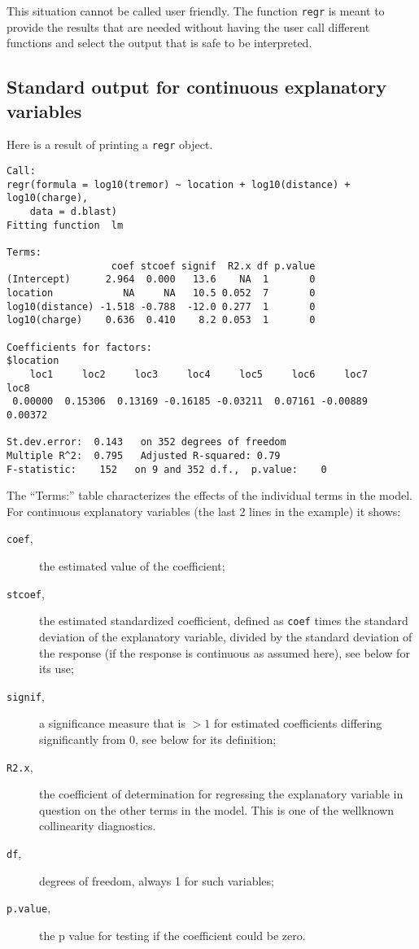 \documentclass{article}
\providecommand{\T}{\texttt}
\begin{document}
This situation cannot be called user friendly.
The function \T{regr} is meant to provide the results that are needed
without having the user call different functions and select the 
output that is safe to be interpreted.

\subsection{Standard output for continuous explanatory variables}
Here is a result of printing a \T{regr} object.
\begin{verbatim}
Call:
regr(formula = log10(tremor) ~ location + log10(distance) + log10(charge), 
    data = d.blast)
Fitting function  lm

Terms:
                  coef stcoef signif  R2.x df p.value
(Intercept)      2.964  0.000   13.6    NA  1       0
location            NA     NA   10.5 0.052  7       0
log10(distance) -1.518 -0.788  -12.0 0.277  1       0
log10(charge)    0.636  0.410    8.2 0.053  1       0

Coefficients for factors:
$location
    loc1     loc2     loc3     loc4     loc5     loc6     loc7     loc8 
 0.00000  0.15306  0.13169 -0.16185 -0.03211  0.07161 -0.00889  0.00372 

St.dev.error:  0.143   on 352 degrees of freedom
Multiple R^2:  0.795   Adjusted R-squared: 0.79 
F-statistic:    152   on 9 and 352 d.f.,  p.value:    0 
\end{verbatim}

The ``Terms:'' table characterizes the effects of the individual terms in the
model. For continuous explanatory variables (the last 2 lines in the
example) it shows:
\begin{description}
\item[\T{coef},] the estimated value of the coefficient;
\item[\T{stcoef},] the estimated standardized coefficient,
  defined as \T{coef} times the standard deviation of the explanatory
  variable, divided by the standard deviation of the response (if
  the response is continuous as assumed here), see below for its use;
\item[\T{signif},] a significance measure that is $>1$ for estimated
  coefficients differing significantly from 0, see below for its
  definition;
\item[\T{R2.x},] the coefficient of determination for regressing 
  the explanatory variable in question on the other terms in the model.
  This is one of the wellknown collinearity diagnostics.
\item[\T{df},] degrees of freedom, always 1 for such variables;
\item[\T{p.value},] the p value for testing if the coefficient could be
  zero. 
\end{description}
\end{document}
